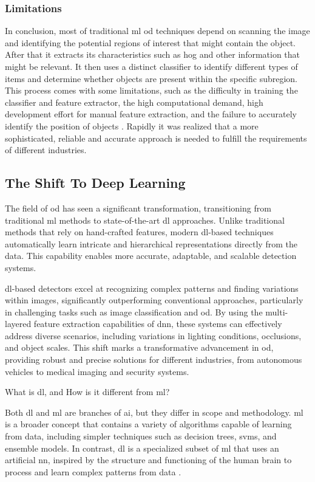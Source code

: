 \subsubsection{Limitations}
In conclusion, most of traditional \gls{ml} \gls{od} techniques depend on scanning the image and identifying the potential regions of interest that might contain the object. After that it extracts its characteristics such as \gls{hog} and other information that might be relevant. It then uses a distinct classifier to identify different types of items and determine whether objects are present within the specific subregion. This process comes with some limitations, such as the difficulty in training the classifier and feature extractor, the high computational demand, high development effort for manual feature extraction, and the failure to accurately identify the position of objects \cite{OD_Survey}. Rapidly it was realized that a more sophisticated, reliable and accurate approach is needed to fulfill the requirements of different industries.


\subsection{The Shift To Deep Learning}
The field of \gls{od} has seen a significant transformation, transitioning from traditional \gls{ml} methods to state-of-the-art \gls{dl} approaches. Unlike traditional methods that rely on hand-crafted features, modern \gls{dl}-based techniques automatically learn intricate and hierarchical representations directly from the data. This capability enables more accurate, adaptable, and scalable detection systems.  

\gls{dl}-based detectors excel at recognizing complex patterns and finding variations within images, significantly outperforming conventional approaches, particularly in challenging tasks such as image classification and \gls{od}. By using the multi-layered feature extraction capabilities of \gls{dnn}, these systems can effectively address diverse scenarios, including variations in lighting conditions, occlusions, and object scales. This shift marks a transformative advancement in \gls{od}, providing robust and precise solutions for different industries, from autonomous vehicles to medical imaging and security systems.  

What is \gls{dl}, and How is it different from \gls{ml}? 

Both \gls{dl} and \gls{ml} are branches of \gls{ai}, but they differ in scope and methodology. \gls{ml} is a broader concept that contains a variety of algorithms capable of learning from data, including simpler techniques such as decision trees, \gls{svm}s, and ensemble models. In contrast, \gls{dl} is a specialized subset of \gls{ml} that uses an artificial \gls{nn}, inspired by the structure and functioning of the human brain to process and learn complex patterns from data  \cite{DL_VS_ML} \cite{oD_Review}.

